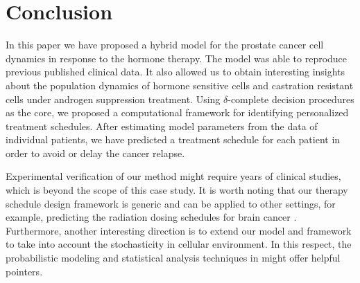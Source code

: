 \section{Conclusion}
\label{sec:Conclusion}

In this paper we have proposed a hybrid model for the prostate cancer cell dynamics in response to the hormone therapy. The model was able to reproduce previous published clinical data. It also allowed us to obtain interesting insights about the population dynamics of hormone sensitive cells and castration resistant cells under androgen suppression treatment. Using $\delta$-complete decision procedures as the core, we proposed a computational framework for identifying personalized treatment schedules. After estimating model parameters from the data of individual patients, we have predicted a treatment schedule for each patient in order to avoid or delay the cancer relapse.

Experimental verification of our method might require years of clinical studies, which is beyond the scope of this case study. It is worth noting that our therapy schedule design framework is generic and can be applied to other settings, for example, predicting the radiation dosing schedules for brain cancer \cite{leder14}. Furthermore, another interesting direction is to extend our model and framework to take into account the stochasticity in cellular environment. In this respect, the probabilistic modeling and statistical analysis techniques in \cite{liu11,liu13,liu12bioinfo} might offer helpful pointers.
